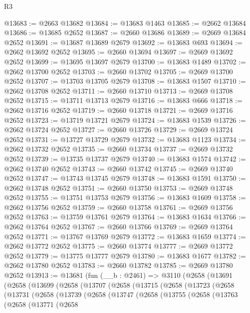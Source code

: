 \begin{lexlean}{R3}
\begin{coremodule}
@13683 := @2663 @13682
@13684 := @13683 @1463
@13685 := @2662 @13684
@13686 := @13685 @2652
@13687 := @2660 @13686
@13689 := @2669 @13684 @2652
@13691 := @13687 @13689 @2679
@13692 := @13683 @693
@13694 := @2662 @13692 @2652
@13695 := @2660 @13694
@13697 := @2669 @13692 @2652
@13699 := @13695 @13697 @2679
@13700 := @13683 @1489
@13702 := @2662 @13700 @2652
@13703 := @2660 @13702
@13705 := @2669 @13700 @2652
@13707 := @13703 @13705 @2679
@13708 := @13683 @1507
@13710 := @2662 @13708 @2652
@13711 := @2660 @13710
@13713 := @2669 @13708 @2652
@13715 := @13711 @13713 @2679
@13716 := @13683 @666
@13718 := @2662 @13716 @2652
@13719 := @2660 @13718
@13721 := @2669 @13716 @2652
@13723 := @13719 @13721 @2679
@13724 := @13683 @1539
@13726 := @2662 @13724 @2652
@13727 := @2660 @13726
@13729 := @2669 @13724 @2652
@13731 := @13727 @13729 @2679
@13732 := @13683 @1123
@13734 := @2662 @13732 @2652
@13735 := @2660 @13734
@13737 := @2669 @13732 @2652
@13739 := @13735 @13737 @2679
@13740 := @13683 @1574
@13742 := @2662 @13740 @2652
@13743 := @2660 @13742
@13745 := @2669 @13740 @2652
@13747 := @13743 @13745 @2679
@13748 := @13683 @1591
@13750 := @2662 @13748 @2652
@13751 := @2660 @13750
@13753 := @2669 @13748 @2652
@13755 := @13751 @13753 @2679
@13756 := @13683 @1609
@13758 := @2662 @13756 @2652
@13759 := @2660 @13758
@13761 := @2669 @13756 @2652
@13763 := @13759 @13761 @2679
@13764 := @13683 @1634
@13766 := @2662 @13764 @2652
@13767 := @2660 @13766
@13769 := @2669 @13764 @2652
@13771 := @13767 @13769 @2679
@13772 := @13683 @1659
@13774 := @2662 @13772 @2652
@13775 := @2660 @13774
@13777 := @2669 @13772 @2652
@13779 := @13775 @13777 @2679
@13780 := @13683 @1677
@13782 := @2662 @13780 @2652
@13783 := @2660 @13782
@13785 := @2669 @13780 @2652
@13913 := @13681
    (fun (__b : @2461) =>
    @3110
      (@2658
        (@13691
          (@2658
            (@13699
              (@2658
                (@13707
                  (@2658
                    (@13715
                      (@2658
                        (@13723
                          (@2658
                            (@13731
                              (@2658
                                (@13739
                                  (@2658
                                    (@13747
                                      (@2658
                                        (@13755
                                          (@2658
                                            (@13763
                                              (@2658
                                                (@13771
                                                  (@2658

\end{coremodule}
\end{lexlean}
